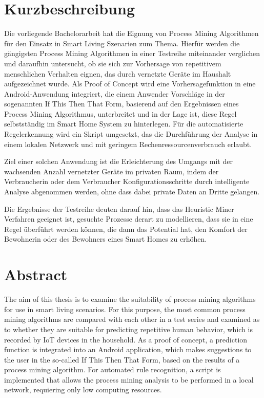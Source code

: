 \chapter*{Kurzbeschreibung}\vspace{17mm}
Die vorliegende Bachelorarbeit hat die Eignung von Process Mining Algorithmen für den Einsatz in Smart Living Szenarien zum Thema. Hierfür werden die gängigsten Process Mining Algorithmen in einer Testreihe miteinander verglichen und daraufhin untersucht, ob sie sich zur Vorhersage von repetitivem menschlichen Verhalten eignen, das durch vernetzte Geräte im Haushalt aufgezeichnet wurde. Als Proof of Concept wird eine Vorhersagefunktion in eine Android-Anwendung integriert, die einem Anwender Vorschläge in der sogenannten If This Then That Form, basierend auf den Ergebnissen eines Process Mining Algorithmus, unterbreitet und in der Lage ist, diese Regel selbstständig im Smart Home System zu hinterlegen. Für die automatisierte Regelerkennung wird ein Skript umgesetzt, das die Durchführung der Analyse in einem lokalen Netzwerk und mit geringem Rechenressourcenverbrauch erlaubt.

Ziel einer solchen Anwendung ist die Erleichterung des Umgangs mit der wachsenden Anzahl vernetzter Geräte im privaten Raum, indem der Verbraucherin oder dem Verbraucher Konfigurationsschritte durch intelligente Analyse abgenommen werden, ohne dass dabei private Daten an Dritte gelangen.

Die Ergebnisse der Testreihe deuten darauf hin, dass das Heuristic Miner Verfahren geeignet ist, gesuchte Prozesse derart zu modellieren, dass sie in eine Regel überführt werden können, die dann das Potential hat, den Komfort der Bewohnerin oder des Bewohners eines Smart Homes zu erhöhen.

\newpage
\chapter*{Abstract}\vspace{17mm}
The aim of this thesis is to examine the suitability of process mining algorithms for use in smart living scenarios. For this purpose, the most common process mining algorithms are compared with each other in a test series and examined as to whether they are suitable for predicting repetitive human behavior, which is  recorded by IoT devices in the household. As a proof of concept, a prediction function is integrated into an Android application, which makes suggestions to the user in the so-called If This Then That Form, based on the results of a process mining algorithm. 
For automated rule recognition, a script is implemented that allows the process mining analysis to be performed in a local network, requiering only low computing resources. 

